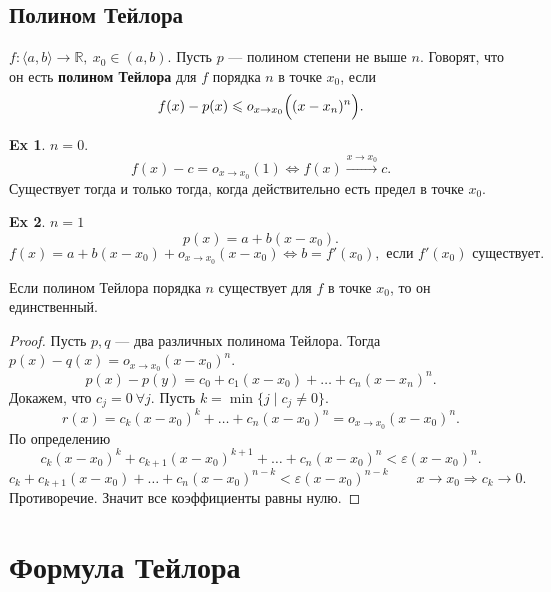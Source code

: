 \documentclass[11pt]{book}
\newcommand{\R}{\mathbb{R}}
\renewcommand{\le}{\leqslant}
\theoremstyle{definition}
\theoremstyle{plain}
\theoremstyle{plain}
\theoremstyle{definition}
\newtheorem*{ex}{Ex}
\theoremstyle{remark}
\begin{document}
\subsection{Полином Тейлора}
\begin{defn}
    $ f: \langle a, b \rangle \to \R, ~ x_0 \in (a, b)$. Пусть $ p$ --- полином степени не выше  $ n$. Говорят, что он есть  {\bf полином Тейлора} для $ f$ порядка  $ n$ в точке  $ x_0$, если \[
	f(x) - p(x) \le o_{x \to  x_0}\Bigl((x - x_{n})^{n}\Bigr)
    .\] 
\end{defn}
\begin{ex}
    $ n = 0$. 
    \[
	f(x) -c = o_{x \to  x_0}(1) \Longleftrightarrow f(x) \stackrel{x \to  x_0} \to c
    .\] 
    Существует тогда и только тогда, когда действительно есть предел в точке $ x_0$.
\end{ex}
\begin{ex}
    $ n = 1$
     \[
	 p(x) = a + b(x-x_0)
    .\] 
    \[
	f(x) = a + b(x-x_0) + o_{x \to  x_0}(x-x_0) \Longleftrightarrow b = f'(x_0), \text{ если } f'(x_0) \text{ существует}
    .\] 
\end{ex}
\begin{thm}
    Если полином Тейлора порядка $ n$ существует для $ f$ в точке $ x_0$, то он единственный.
\end{thm}
\begin{proof}
    Пусть $ p, q$ --- два различных полинома Тейлора. Тогда $ p(x) - q(x) = o_{x \to  x_0}(x-x_{0})^{n}$.
    \[
	p(x) - p(y) = c_0 + c_1(x-x_0) + \ldots + c_n(x-x_{n})^{n}
    .\] 
    Докажем, что $ c_j = 0 ~ \forall j$.
    Пусть $ k = \min \{j\mid c_j \ne 0 \}$.
    \[
	r(x) = c_k(x-x_0)^{k} + \ldots + c_n(x-x_0)^{n} = o_{x \to  x_0}(x-x_0)^{n}
    .\] 
    По определению
    \[
	c_k(x-x_0)^{k} + c_{k+1}(x-x_0)^{k+1} + \ldots + c_n(x-x_0)^{n} < \varepsilon (x-x_0)^{n}
    .\] 
    \[
	c_k + c_{k+1} (x-x_0) + \ldots + c_n (x-x_0)^{n-k} < \varepsilon (x-x_0)^{n-k} \qquad x \to  x_0 \Longrightarrow c_k \to 0
    .\] 
    Противоречие. Значит все коэффициенты равны нулю.
\end{proof}
\section{Формула Тейлора}
\end{document}
